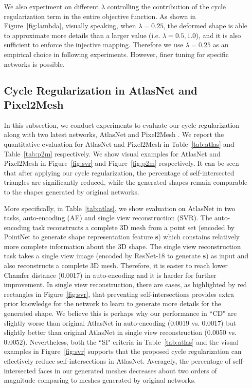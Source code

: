 We also experiment on different $\lambda$ controlling the contribution of the cycle regularization term in the entire objective function. As shown in Figure~\ref{fig:lambda}, visually speaking, when $\lambda=0.25$, the deformed shape is able to approximate more details than a larger value (i.e. $\lambda=0.5,1.0$), and it is also sufficient to enforce the injective mapping.  Therefore we use $\lambda=0.25$ as an empirical choice in following experiments. However, finer tuning for specific networks is possible.

\subsection{Cycle Regularization in AtlasNet and Pixel2Mesh}
In this subsection, we conduct experiments to evaluate our cycle regularization along with two latest networks, AtlasNet \cite{atlasnet} and Pixel2Mesh \cite{pixel2mesh}. We report the quantitative evaluation for AtlasNet and Pixel2Mesh in Table~\ref{tab:atlas} and Table~\ref{tab:p2m} respectively. We show visual examples for AtlasNet and Pixel2Mesh in Figure~\ref{fig:svr} and Figure~\ref{fig:p2m} respectively. It can be seen that after applying our cycle regularization, the percentage of self-intersected triangles are significantly reduced, while the generated shapes remain comparable to the shapes generated by original networks.

More specifically, in Table~\ref{tab:atlas}, we show evaluation on AtlasNet in two tasks, auto-encoding (AE) and single view reconstruction (SVR). The auto-encoding task reconstructs a complete 3D mesh from a point set (encoded by PointNet\cite{pointnet} to generate shape representation feature $\mathbf{s}$) which constains relatively more complete information about the 3D shape. The single view reconstruction task takes a single view image (encoded by ResNet-18 \cite{resnet} to generate $\mathbf{s}$) as input and also reconstructs a complete 3D mesh. Therefore, it is easier to reach lower Chamfer distance (0.0017) in auto-encoding and it is harder for further improvement.  In single view reconstruction, there are cases, as highlighted by red rectangles in Figure~\ref{fig:svr}, that preventing self-intersections provides extra prior knowledge for the network to learn to generate more details for the generated shape. We believe this is perhaps why our performance in ``CD"  are slightly worse than original AtlasNet in auto-encoding (0.0019 vs. 0.0017) but slightly better than original AtlasNet in single view reconstruction (0.0050 vs. 0.0052). Nevertheless, both the ``SI" criteria in Table~\ref{tab:atlas} and the visual examples in Figure~\ref{fig:svr} supports that the proposed cycle regularization can effectively reduce self-intersections in AtlasNet. Averagely, the percentage of self-intersected faces in our generated meshes decreases about two orders of magnitude comparing to meshes generated by original networks.

